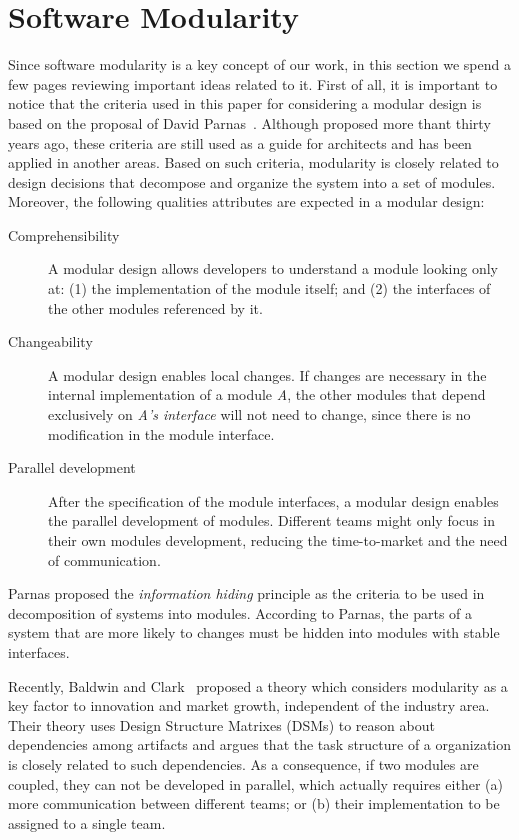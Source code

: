 \section{Software Modularity}\label{sec:software-modularity}

Since software modularity is a key concept of our work, in this section we
spend a few pages reviewing important ideas related to it. First of all, it
is important to notice that the criteria used in this paper for
considering a modular design is based on the proposal of David Parnas~\cite{parnas-cacm-1972}. 
Although proposed more thant thirty years ago, these criteria are still used as
a guide for architects and has been applied in another areas. Based on
such criteria, modularity is closely related to design decisions that decompose
and organize the system into a set of modules. 
Moreover, the following qualities attributes are expected in a modular design:

\begin{description}

\item[Comprehensibility] A modular design allows developers to
understand a module looking only at: (1) the implementation of the
module itself; and (2) the interfaces of the other modules
referenced by it. 


\item[Changeability] A modular design enables local
changes. If changes are necessary in the internal implementation of
a module \emph{A}, the other modules that depend exclusively on
\emph{A's interface} will not need to change, since there is no
modification in the module interface.

\item[Parallel development] After the specification of the module
interfaces, a modular design enables the parallel development of
modules. Different teams might only focus in their own modules
development, reducing the time-to-market and the need of
communication.

\end{description}

Parnas proposed the \emph{information hiding} principle as the
criteria to be used in decomposition of systems into modules.
According to Parnas, the parts of a system that are more likely to
changes must be hidden into modules with stable interfaces.

Recently, Baldwin and Clark~\cite{clark-design-rules-book} proposed a theory
which considers modularity as a key factor to innovation and market growth,
independent of the industry area. Their theory uses Design Structure Matrixes
(DSMs) to reason about dependencies among artifacts and argues that the task
structure of a organization is closely related to such dependencies. As a
consequence, if two modules are coupled, they can not be developed in
parallel, which actually requires either (a) more communication between
different teams; or (b) their implementation to be assigned to a single team.


